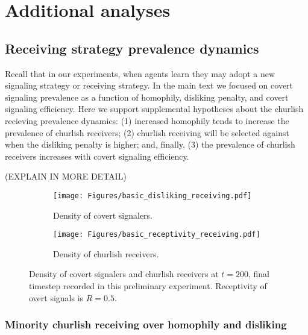 \documentclass[11pt,letterpaper]{article}
\begin{document}
% 


% 

\appendix

\section{Additional analyses}

\subsection{Receiving strategy prevalence dynamics}

Recall that in our experiments, when agents learn they may adopt a new signaling 
strategy or receiving strategy.  In the main text we focused on covert 
signaling prevalence as a function of homophily, disliking penalty, and 
covert signaling efficiency. Here we support supplemental hypotheses about
the churlish recieving prevalence dynamics: (1) increased homophily tends
to increase the prevalence of churlish receivers; (2) churlish receiving
will be selected against when the disliking penalty is higher; and,
finally, (3) the prevalence of churlish receivers increases with 
covert signaling efficiency. 

(EXPLAIN IN MORE DETAIL)

\begin{figure}[H]
  \centering
  \begin{subfigure}{0.49\textwidth}
    \centering
    \texttt{[image: Figures/basic\_disliking\_receiving.pdf]}
    \caption{Density of covert signalers.}
  \end{subfigure}
  \begin{subfigure}{0.49\textwidth}
    \centering
    \texttt{[image: Figures/basic\_receptivity\_receiving.pdf]}
    \caption{Density of churlish receivers.}
  \end{subfigure}
  
  \caption{Density of covert signalers and churlish receivers at $t=200$, 
    final timestep recorded in this preliminary experiment. Receptivity of
    overt signals is $R=0.5$.}
  \label{fig:receptivityHomophilyHeatmap}
\end{figure}

\subsubsection{Minority churlish receiving over homophily and disliking}
\end{document}
